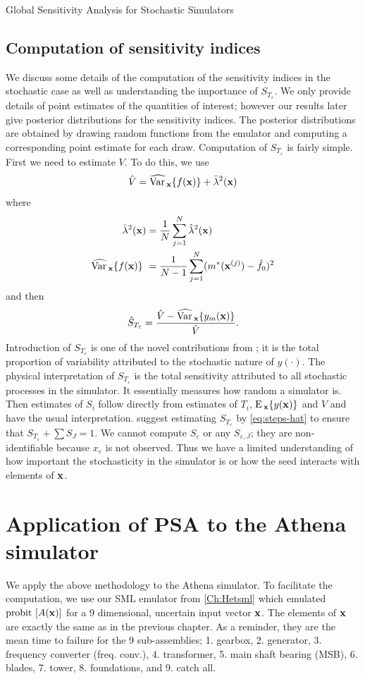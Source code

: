 \begin{chapter}{Global Sensitivity Analysis for Stochastic Simulators\label{Ch:sensitivity}}
\subsection{Computation of sensitivity indices}
We discuss some details of the computation of the sensitivity indices in the stochastic case as well as understanding the importance of $S_{T_\varepsilon}$. We only provide details of point estimates of the quantities of interest; however our results later give posterior distributions for the sensitivity indices. The posterior distributions are obtained by drawing random functions from the emulator and computing a corresponding point estimate for each draw.
Computation of $S_{T_\varepsilon}$ is fairly simple. First we need to estimate $V$. To do this, we use
\begin{equation}
\hat{V} = \widehat{\mathrm{Var}\,}_{\mathbf{x}} \{ f(\mathbf{x}) \}  + \bar{\lambda}^2 (\mathbf{x})
\end{equation}
where
\begin{align}
\bar{\lambda}^2 (\mathbf{x}) &  = \frac{1}{N} \sum_{j=1}^N \hat{\lambda}^2(\mathbf{x})\\
\widehat{\mathrm{Var}\,}_{\mathbf{x}} \{ f(\mathbf{x}) \} \ &= \frac{1}{N-1} \sum_{j=1}^N (m^*(\mathbf{x}^{(j)}) - \hat{f}_0)^2
\end{align}
and then
\begin{equation}
 \hat{S}_{T_\varepsilon} = \frac{\hat{V} - \widehat{\mathrm{Var}\,}_{\mathbf{x}} \{ y_m(\mathbf{x}) \} }{\hat{V}}. \label{eq:steps-hat}
\end{equation}
Introduction of $S_{T_\varepsilon}$ is one of the novel contributions from \citet{Marrel2012}; it is the total proportion of variability attributed to the stochastic nature of $y(\cdot)$. The physical interpretation of $S_{T_\varepsilon}$ is the total sensitivity attributed to all stochastic processes in the simulator. It essentially measures how random a simulator is.
Then estimates of $S_i$ follow directly from estimates of $T_i$, $\textrm{E}\,_{\mathbf{x}} \{y(\mathbf{x}) \}$ and $V$ and have the usual interpretation. \citet{Marrel2012} suggest estimating $S_{T_\varepsilon}$ by \cref{eq:steps-hat} to ensure that $S_{T_\varepsilon} + \sum S_J = 1$. We cannot compute $S_\varepsilon$ or any $S_{\varepsilon, J}$; they are non-identifiable because $x_\varepsilon$ is not observed. Thus we have a limited understanding of how important the stochasticity in the simulator is or how the seed interacts with elements of $\mathbf{x}$.

\section{Application of PSA to the Athena simulator}
We apply the above methodology to the Athena simulator. To facilitate the computation, we use our SML emulator from \cref{Ch:Hetsml} which emulated $\text{probit}\, \left[ A(\mathbf{x}) \right]$ for a $9$ dimensional, uncertain input vector $\mathbf{x}$. The elements of $\mathbf{x}$ are exactly the same as in the previous chapter. As a reminder, they are the mean time to failure for the 9 sub-assemblies; 1. gearbox, 2. generator, 3. frequency converter (freq. conv.), 4. transformer, 5. main shaft bearing (MSB), 6. blades, 7. tower, 8. foundations, and 9. catch all.


\end{chapter}
